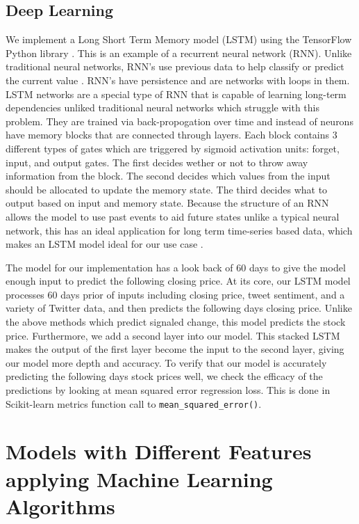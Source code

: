\documentclass[../thesis.tex]{subfiles}
\begin{document}
\subsection{Deep Learning}
We implement a Long Short Term Memory model (LSTM) using the TensorFlow Python library \cite{Abadi}. This is an example of a recurrent neural network (RNN). Unlike traditional neural networks, RNN's use previous data to help classify or predict the current value \cite{Colah2015}. RNN's have persistence and are networks with loops in them.  LSTM networks are a special type of RNN that is capable of learning long-term dependencies unliked traditional neural networks which struggle with this problem. They are trained via back-propogation over time and instead of neurons have memory blocks that are connected through layers. Each block contains 3 different types of gates which are triggered by sigmoid activation units: forget, input, and output gates. The first decides wether or not to throw away information from the block. The second decides which values from the input should be allocated to update the memory state. The third decides what to output based on input and memory state. Because the structure of an RNN allows the model to use past events to aid future states unlike a typical neural network, this has an ideal application for long term time-series based data, which makes an LSTM model ideal for our use case \cite{Colah2015}.


The model for our implementation has a look back of 60 days to give the model enough input to predict the following closing price. At its core, our LSTM model processes 60 days prior of inputs including closing price, tweet sentiment, and a variety of Twitter data, and then predicts the following days closing price. Unlike the above methods which predict signaled change, this model predicts the stock price. Furthermore, we add a second layer into our model. This stacked LSTM makes the output of the first layer become the input to the second layer, giving our model more depth and accuracy. To verify that our model is accurately predicting the following days stock prices well, we check the efficacy of the predictions by looking at mean squared error regression loss. This is done in Scikit-learn metrics function call to \texttt{mean\_squared\_error()}. 


\section{Models with Different Features applying Machine Learning Algorithms}
\end{document}
